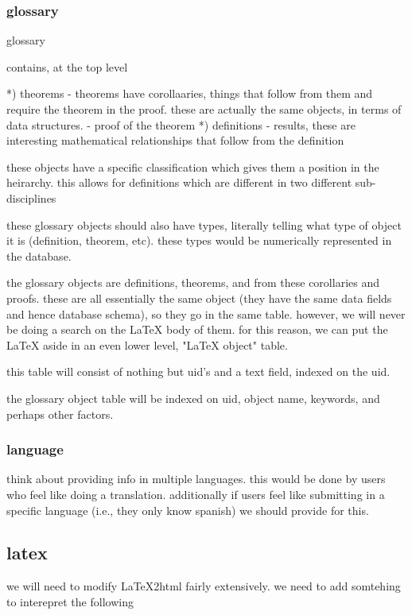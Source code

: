 \subsubsection*{glossary}

glossary

contains, at the top level

*) theorems - theorems have corollaaries, things that follow from them and require the theorem in the proof.  these are actually the same objects, in terms of data structures. - proof of the theorem
*) definitions - results, these are interesting mathematical relationships that follow from the definition

these objects have a specific classification which gives them a position in the heirarchy. this allows for definitions which are different in two different sub-disciplines 

these glossary objects should also have types, literally telling what type of object it is (definition, theorem, etc).  these types would be numerically represented in the database.

the glossary objects are definitions, theorems, and from these corollaries and proofs.  these are all essentially the same object (they have the same data fields and hence database schema), so they go in the same table.  however, we will never be doing a search on the LaTeX body of them. for this reason, we can put the LaTeX aside in an even lower level, "LaTeX object" table.

this table will consist of nothing but uid's and a text field, indexed on the uid.  

the glossary object table will be indexed on uid, object name, keywords, and perhaps other factors.

\subsubsection*{language}

think about providing info in multiple languages. this would be done by users who feel like doing a translation. additionally if users feel like submitting in a specific language (i.e., they only know spanish) we should provide for this.

\subsection{latex}

we will need to modify LaTeX2html fairly extensively. we need to add somtehing to interepret the following 

